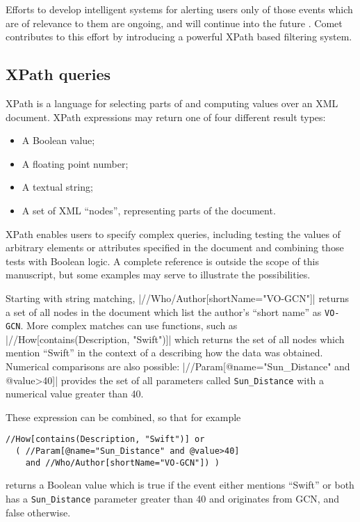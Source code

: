 \documentclass[5p,authoryear]{elsarticle}
\begin{document}
Efforts to develop intelligent systems for alerting users only of those events
which are of relevance to them are ongoing, and will continue into the future
\citep{Williams:2009}. Comet contributes to this effort by introducing a
powerful XPath \citep{Clark:1999} based filtering system.

\subsection{XPath queries}

XPath is a language for selecting parts of and computing values over an XML
document. XPath expressions may return one of four different result types:

\begin{itemize}
  \item{A Boolean value;}
  \item{A floating point number;}
  \item{A textual string;}
  \item{A set of XML ``nodes'', representing parts of the document.}
\end{itemize}

XPath enables users to specify complex queries, including testing
the values of arbitrary elements or attributes specified in the document and
combining those tests with Boolean logic. A complete reference is outside the
scope of this manuscript, but some examples may serve to illustrate the
possibilities.

Starting with string matching, |//Who/Author[shortName="VO-GCN"]|
returns a set of all nodes in the document which list the author's ``short
name'' as \texttt{VO-GCN}. More complex matches can use functions, such as
|//How[contains(Description, "Swift")]| which returns the set of all
nodes which mention ``Swift'' in the context of a describing how the data was
obtained. Numerical comparisons are also possible:
|//Param[@name="Sun_Distance" and @value>40]| provides the set of
all parameters called \texttt{Sun\_Distance} with a numerical value greater
than 40.

These expression can be combined, so that for example
\begin{verbatim}
//How[contains(Description, "Swift")] or
  ( //Param[@name="Sun_Distance" and @value>40]
    and //Who/Author[shortName="VO-GCN"]) )
\end{verbatim}
returns a Boolean value which is true if the event either mentions ``Swift''
or both has a \texttt{Sun\_Distance} parameter greater than 40 and originates
from GCN, and false otherwise.
\end{document}
